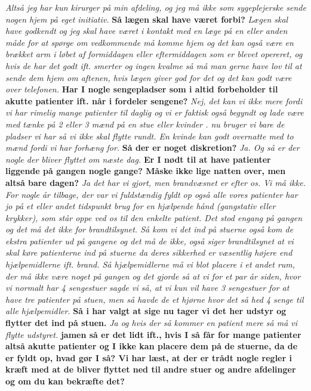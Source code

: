 \textit{Altså jeg har kun kirurger på min afdeling, og jeg må ikke som sygeplejerske sende nogen hjem på eget initiativ.}
\textbf{Så lægen skal have været forbi?}
\textit{Lægen skal have godkendt og jeg skal have været i kontakt med en læge på en eller anden måde for at spørge om vedkommende må komme hjem og det kan også være en brækket arm i løbet af formiddagen eller eftermiddagen som er blevet opereret, og hvis de har det godt ift. smerter og ingen kvalme så må man gerne have lov til at sende dem hjem om aftenen, hvis lægen giver god for det og det kan godt være over telefonen.}
\textbf{Har I nogle sengepladser som i altid forbeholder til akutte patienter ift. når i fordeler sengene?}
\textit{ Nej, det kan vi ikke mere fordi vi har rimelig mange patienter til daglig og vi er faktisk også begyndt og lade være med tænke på 2 eller 3 mænd på en stue eller kvinder . nu bruger vi bare de pladser vi har så vi ikke skal flytte rundt. En kvinde kan godt overnatte med to mænd fordi vi har forhæng for.}
\textbf{Så der er noget diskretion?}
\textit{Ja. Og så er der nogle der bliver flyttet om næste dag.}
\textbf{Er I nødt til at have patienter liggende på gangen nogle gange? Måske ikke lige natten over, men altså bare dagen?}
\textit{Ja det har vi gjort, men brandvæsnet er efter os. Vi må ikke. For nogle år tilbage, der var vi fuldstændig fyldt op også alle vores patienter har jo på et eller andet tidspunkt brug for en hjælpende hånd (gangstativ eller krykker), som står oppe ved os til den enkelte patient. Det stod engang på gangen og det må det ikke for brandtilsynet. Så kom vi det ind på stuerne også kom de ekstra patienter ud på gangene og det må de ikke, også siger brandtilsynet at vi skal køre patienterne ind på stuerne da deres sikkerhed er væsentlig højere end hjælpemidlerne ift. brand. Så hjælpemidlerne må vi blot placere i et andet rum, der må ikke være noget på gangen og det gjorde så at vi for et par år siden, hvor vi normalt har 4 sengestuer sagde vi så, at vi kun vil have 3 sengestuer for at have tre patienter på stuen, men så havde de et hjørne hvor det så hed 4 senge til alle hjælpemidler.}
\textbf{Så i har valgt at sige nu tager vi det her udstyr og flytter det ind på stuen.}
\textit{Ja og hvis der så kommer en patient mere så må vi flytte udstyret. }
\textbf{jamen så er det lidt ift., hvis I så får for mange patienter altså akutte patienter og I ikke kan placere dem på de stuerne, da de er fyldt op, hvad gør I så? Vi har læst, at der er trådt nogle regler i kræft med at de bliver flyttet ned til andre stuer og andre afdelinger og om du kan bekræfte det?}
